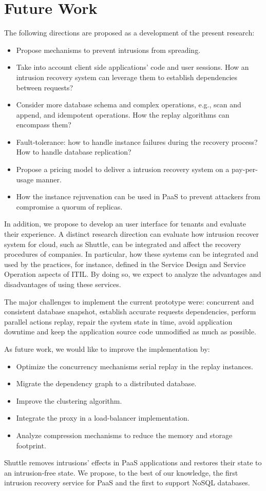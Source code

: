 \section{Future Work}\label{sec:conclusion:future_work}
The following directions are proposed as a development of the present research:
\begin{itemize}
\item Propose mechanisms to prevent intrusions from spreading.
\item Take into account client side applications' code and user sessions. How an intrusion recovery system can leverage them to establish dependencies between requests? 
\item Consider more database schema and complex operations, e.g., scan and append, and idempotent operations.  How the replay algorithms can encompass them?
\item Fault-tolerance: how to handle instance failures during the recovery process? How to handle database replication?
\item Propose a pricing model to deliver a intrusion recovery system on a pay-per-usage manner. 
\item How the instance rejuvenation can be used in PaaS to prevent attackers from compromise a quorum of replicas.
\end{itemize}

In addition, we propose to develop an user interface for tenants and evaluate their experience. A distinct research direction can evaluate how intrusion recover system for cloud, such as Shuttle, can be integrated and affect the recovery procedures of companies. In particular, how these systems can be integrated and used by the practices, for instance, defined in the Service Design and Service Operation aspects of \ac{ITIL}. By doing so, we expect to analyze the advantages and disadvantages of using these services.

The major challenges to implement the current prototype were: concurrent and consistent database snapshot, establish accurate requests dependencies, perform parallel actions replay, repair the system state in time, avoid application downtime and keep the application source code unmodified as much as possible.

As future work, we would like to improve the implementation by:
\begin{itemize}
\item Optimize the concurrency mechanisms serial replay in the replay instances.
\item Migrate the dependency graph to a distributed database.
\item Improve the clustering algorithm.
\item Integrate the proxy in a load-balancer implementation.
\item Analyze compression mechanisms to reduce the memory and storage footprint.
\end{itemize}


Shuttle removes intrusions' effects in \ac{PaaS} applications and restores their state to an intrusion-free state. We propose, to the best of our knowledge, the first intrusion recovery service for \ac{PaaS} and the first to support \acs{NoSQL} databases.
